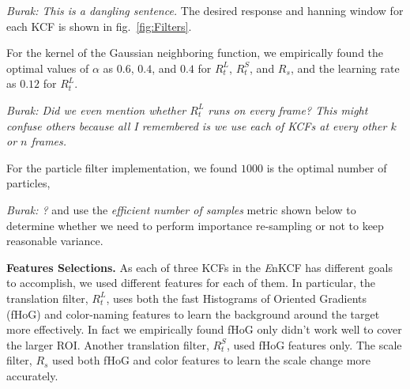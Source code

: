 \documentclass{bmvc2k}
\begin{document}
{\it Burak: This is a dangling sentence.} The desired response and
hanning window for each KCF is shown in fig.~\ref{fig:Filters}.


For the kernel of the Gaussian neighboring function, we empirically
found the optimal values of $\alpha$ as $0.6$, $0.4$, and $0.4$ for
$R_{t}^{L}$, $R_{t}^{S}$, and $R_{s}$, and the learning rate as $0.12$
for $R_{t}^{L}$. 

{\it Burak: Did we even mention whether $R_{t}^{L}$ runs on every
  frame? This might confuse others because all I remembered is we use
  each of KCFs at every other $k$ or $n$ frames.}


For the particle filter implementation, we found $1000$ is the optimal
number of particles, 


{\it Burak: ?}
and use the \textit{efficient number of samples}
metric shown below to determine whether we need to perform importance
re-sampling or not to keep reasonable variance.

\textbf{Features Selections.} As each of three KCFs in the {\it E}nKCF
has different goals to accomplish, we used different features for each
of them. In particular, the translation filter, $R_{t}^{L}$, uses both
the fast Histograms of Oriented Gradients
(fHoG)\cite{felzenszwalb2010object} and
color-naming\cite{van2009learning} features to learn the background
around the target more effectively. In fact we empirically found fHoG
only didn't work well to cover the larger ROI. Another translation
filter, $R_{t}^{S}$, used fHoG features only. The scale filter,
$R_{s}$ used both fHoG and color features to learn the scale change
more accurately.
\end{document}
